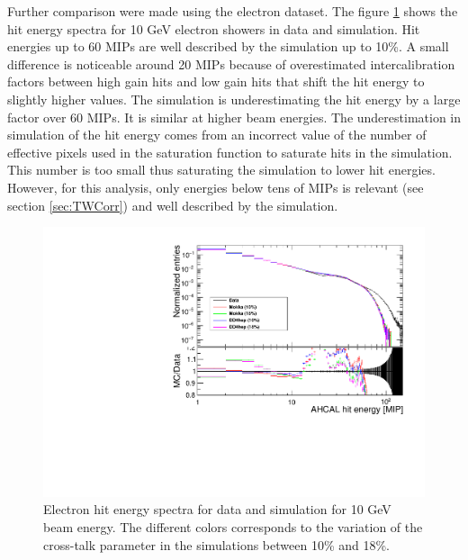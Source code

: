 \documentclass{JINST}
\newcommand\geant{\textsc{Geant\,4}\xspace}
\begin{document}
Further comparison were made using the electron dataset. The figure \ref{fig:HitEnergy10GeVe} shows the hit energy spectra for 10 GeV electron showers in data and simulation. Hit energies up to 60 MIPs are well described by the simulation up to 10\%. A small difference is noticeable around 20 MIPs because of overestimated intercalibration factors between high gain hits and low gain hits that shift the hit energy to slightly higher values. The simulation is underestimating the hit energy by a large factor over 60 MIPs. It is similar at higher beam energies. The underestimation in simulation of the hit energy comes from an incorrect value of the number of effective pixels used in the saturation function to saturate hits in the simulation. This number is too small thus saturating the simulation to lower hit energies. However, for this analysis, only energies below tens of MIPs is relevant (see section \ref{sec:TWCorr}) and well described by the simulation.

\begin{figure}[htbp!]
	\centering
	\includegraphics[width=0.7\linewidth]{fig/HitEnergy_Electrons10GeV.pdf}
	\caption{Electron hit energy spectra for data and simulation for 10 GeV beam energy. The different colors corresponds to the variation of the cross-talk parameter in the simulations between 10\% and 18\%.} \label{fig:HitEnergy10GeVe}
\end{figure}

\end{document}
